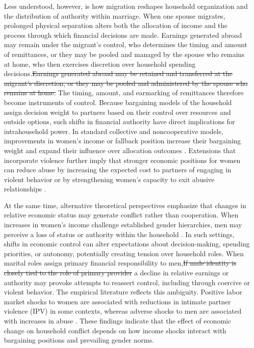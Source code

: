 \documentclass[12pt]{article}
\renewcommand{\replaced}[2]{%
  {\textcolor{replcolor}{#1}}{\textcolor{delcolor}{\sout{#2}}}%
}
\begin{document}
Less understood, however, is how migration reshapes household organization and the distribution of authority within marriage. When one spouse migrates, prolonged physical separation alters both the allocation of income and the process through which financial decisions are made. \replaced
{Earnings generated abroad may remain under the migrant’s control, who determines the timing and amount of remittances, or they may be pooled and managed by the spouse who remains at home, who then exercises discretion over household spending decisions.}{Earnings generated abroad may be retained and transferred at the migrant’s discretion, or they may be pooled and administered by the spouse who remains at home.} The timing, amount, and earmarking of remittances therefore become instruments of control. Because bargaining models of the household assign decision weight to partners based on their control over resources and outside options, such shifts in financial authority have direct implications for intrahousehold power. In standard collective and noncooperative models, improvements in women’s income or fallback position increase their bargaining weight and expand their influence over allocation outcomes \citep{manser1980marriage, mcelroy1981nash}. Extensions that incorporate violence further imply that stronger economic positions for women can reduce abuse by increasing the expected cost to partners of engaging in violent behavior or by strengthening women’s capacity to exit abusive relationships \citep{aizer2010gender}.

At the same time, alternative theoretical perspectives emphasize that changes in relative economic status may generate conflict rather than cooperation. When increases in women’s income challenge established gender hierarchies, men may perceive a loss of status or authority within the household \citep{eswaran2011domestic, anderberg2016unemployment}. In such settings, shifts in economic control can alter expectations about decision-making, spending priorities, or autonomy, potentially creating tension over household roles.  \replaced{When marital roles assign primary financial responsibility to men,}{If male identity is closely tied to the role of primary provider} a decline in relative earnings or authority may provoke attempts to reassert control, including through coercive or violent behavior. The empirical literature reflects this ambiguity. Positive labor market shocks to women are associated with reductions in intimate partner violence (IPV) in some contexts, whereas adverse shocks to men are associated with increases in abuse \citep{aizer2010gender, autor2019work}. These findings indicate that the effect of economic change on household conflict depends on how income shocks interact with bargaining positions and prevailing gender norms.
\end{document}
